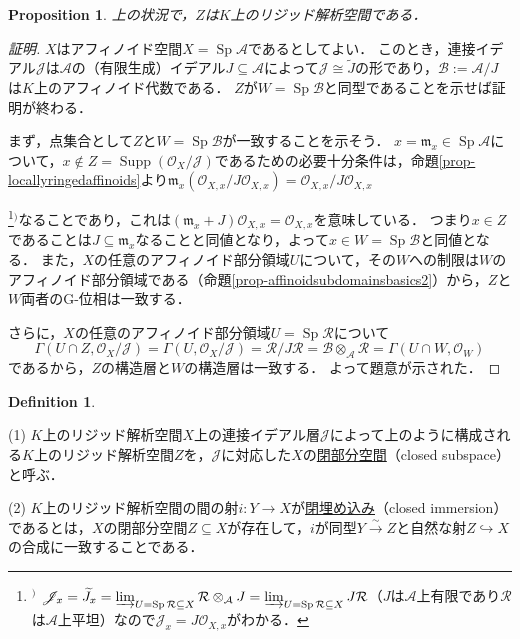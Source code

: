 \documentclass[a4paper,12pt, dvipdfmx]{jsbook}
\def\O{\mathscr{O}}
\def\m{\mathfrak{m}}
\def\til#1{\widetilde{#1}}%
\def\Sp{\mathop{\mathrm{Sp}}\nolimits}
\def\Supp{\mathop{\mathrm{Supp}}\nolimits}
\theoremstyle{plain}
\newtheorem{prop}[thm]{\bfseries Proposition}
\theoremstyle{definition}
\newtheorem{dfn}[thm]{\bfseries Definition}
\newcounter{chushaku}
\def\chu#1{\addtocounter{chushaku}{1}\footnote[\value{chushaku}]{${}^)$ #1}${}^)$}
\begin{document}
\begin{prop}\label{prop-closedimmersions1}{\rm 
上の状況で，$Z$は$K$上のリジッド解析空間である．}
\end{prop}

\begin{proof}[証明]
$X$はアフィノイド空間$X=\Sp\mathcal{A}$であるとしてよい．
このとき，連接イデアル$\mathscr{J}$は$\mathcal{A}$の（有限生成）イデアル$J\subseteq\mathcal{A}$によって$\mathscr{J}\cong\til{J}$の形であり，$\mathcal{B}:=\mathcal{A}/J$は$K$上のアフィノイド代数である．
$Z$が$W=\Sp\mathcal{B}$と同型であることを示せば証明が終わる．

まず，点集合として$Z$と$W=\Sp\mathcal{B}$が一致することを示そう．
$x=\m_x\in\Sp\mathcal{A}$について，$x\not\in Z=\Supp(\O_X/\mathscr{J})$であるための必要十分条件は，命題\ref{prop-locallyringedaffinoids}より$\m_x(\O_{X,x}/J\O_{X,x})=\O_{X,x}/J\O_{X,x}$\chu{$\mathscr{J}_x=\til{J}_x=\varinjlim_{U=\Sp\mathcal{R}\subseteq X}\mathcal{R}\otimes_{\mathcal{A}}J=\varinjlim_{U=\Sp\mathcal{R}\subseteq X}J\mathcal{R}$（$J$は$\mathcal{A}$上有限であり$\mathcal{R}$は$\mathcal{A}$上平坦）なので$\mathscr{J}_x=J\O_{X,x}$がわかる．}なることであり，これは$(\m_x+J)\O_{X,x}=\O_{X,x}$を意味している．
つまり$x\in Z$であることは$J\subseteq\m_x$なることと同値となり，よって$x\in W=\Sp\mathcal{B}$と同値となる．
また，$X$の任意のアフィノイド部分領域$U$について，その$W$への制限は$W$のアフィノイド部分領域である（命題\ref{prop-affinoidsubdomainsbasics2}）から，$Z$と$W$両者のG-位相は一致する．

さらに，$X$の任意のアフィノイド部分領域$U=\Sp\mathcal{R}$について
$$
\Gamma(U\cap Z,\O_X/\mathscr{J})=\Gamma(U,\O_X/\mathscr{J})=\mathcal{R}/J\mathcal{R}=\mathcal{B}\otimes_{\mathcal{A}}\mathcal{R}=\Gamma(U\cap W,\O_W)
$$
であるから，$Z$の構造層と$W$の構造層は一致する．
よって題意が示された．
\end{proof}

\begin{dfn}\label{dfn-closedimmersions}{\rm 
(1) $K$上のリジッド解析空間$X$上の連接イデアル層$\mathscr{J}$によって上のように構成される$K$上のリジッド解析空間$Z$を，$\mathscr{J}$に対応した$X$の\underline{閉部分空間}（closed subspace）と呼ぶ．

(2) $K$上のリジッド解析空間の間の射$i\colon Y\rightarrow X$が\underline{閉埋め込み}（closed immersion）であるとは，$X$の閉部分空間$Z\subseteq X$が存在して，$i$が同型$Y\stackrel{\sim}{\rightarrow}Z$と自然な射$Z\hookrightarrow X$の合成に一致することである．}
\end{dfn}
\end{document}
